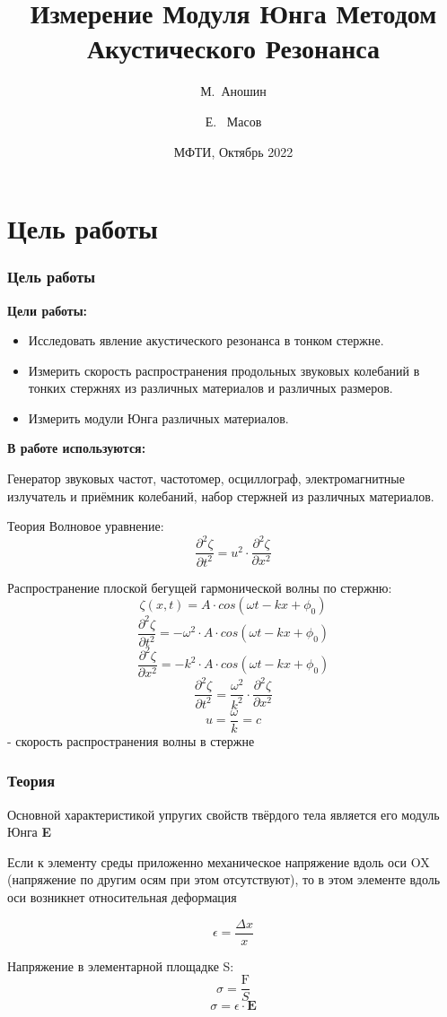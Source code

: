 \documentclass[xcolor=table]{beamer}
\title[Измерение Модуля Юнга] %
{Измерение Модуля Юнга
Методом Акустического
Резонанса}
\author[Аношин, Масов] 
{М.~Аношин\inst{1} \and Е. ~Масов\inst{1}}
\date[15.10.2022] 
{МФТИ, Октябрь 2022}
\begin{document}
\frame{\titlepage}

\section{Цель работы}
\begin{frame}
\frametitle{Цель работы}
    \large{\textbf{Цели работы:}}
    \begin{itemize}
        \item Исследовать явление акустического резонанса в тонком стержне.
        \item Измерить скорость распространения продольных звуковых колебаний в тонких стержнях из различных материалов и различных размеров.
        \item Измерить модули Юнга различных материалов.
    \end{itemize}
    \vspace{15}
    \large{\textbf{В работе используются:}}\\
    \begin{itemize}
        \large \normalsize{Генератор звуковых частот, частотомер, осциллограф,
                электромагнитные излучатель и приёмник колебаний, набор стержней из различных материалов.}
    \end{itemize}
\end{frame}

\begin{frame}{Теория}
    Волновое уравнение:
    $$ \frac{\partial^2 \zeta}{\partial  t^2} = u^2 \cdot \frac{\partial^2 \zeta}{\partial  x^2} $$
    
    Распространение плоской бегущей гармонической волны по стержню:
    $$ \zeta (x, t) = A\cdot cos(\omega t - kx + \phi_0) $$
    $$ \frac{\partial^2 \zeta}{\partial  t^2} = -\omega^2 \cdot A \cdot cos(\omega t - kx +\phi_0)$$
    $$ \frac{\partial^2 \zeta}{\partial  x^2} = -k^2 \cdot A \cdot cos(\omega t - kx +\phi_0)$$
    $$\frac{\partial^2 \zeta}{\partial  t^2} = \frac{\omega^2}{k^2} \cdot \frac{\partial^2 \zeta}{\partial  x^2}$$
    $$u = \frac{\omega}{k} = c$$ 
    \centering - скорость распространения волны в стержне
\end{frame}

\begin{frame}
\frametitle{Теория}
    \large Основной характеристикой упругих свойств твёрдого тела является его
        модуль Юнга \textbf{E}
        
    \large Если к элементу среды приложенно механическое напряжение вдоль
        оси OX (напряжение по другим осям при этом отсутствуют), то в этом элементе
        вдоль оси возникнет относительная деформация
        
    $$ \epsilon = \frac{\Delta x}{x} $$
    
    \large Напряжение в элементарной площадке S:
    \large $$ \sigma = \frac{\text{F}}{S} $$
    \large \[ \sigma = \epsilon \cdot \textbf{E}\]
\end{frame}
\end{document}
